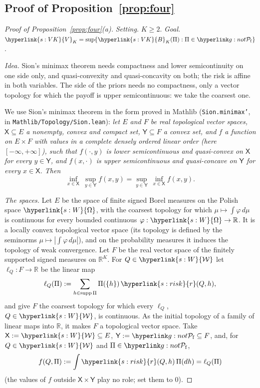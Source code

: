 \documentclass[11pt]{article}
\DeclareRobustCommand{\sy}[2]{{\hyperlink{#1}{#2}}}
\newcommand{\R}{\mathbb{R}}
\newcommand{\1}{\mathbf{1}}
\newcommand{\Wc}{\sy{s:W}{\mathcal W}}
\newcommand{\Om}{\sy{s:W}{\Omega}}
\newcommand{\rk}{\sy{s:risk}{r}}
\newcommand{\VK}{\sy{s:VK}{V}}
\newcommand{\BK}{\sy{s:VK}{B}}
\begin{document}
\subsection{Proof of Proposition~\ref{prop:four}}\label{sec:app-g-proof}

\begin{proof}[Proof of Proposition~\ref{prop:four}(a)]
\textit{Setting.} $K\ge2$. \textit{Goal.} $\VK_K=\sup\{\BK_K(\Pi):\Pi\in\gPf\}$.

\textit{Idea.} Sion's minimax theorem needs compactness and lower semicontinuity on one side only, and quasi-convexity and quasi-concavity on both; the
risk is affine in both variables. The side of the priors needs no compactness, only a vector topology for which the payoff is upper semicontinuous: we
take the coarsest one.

We use Sion's minimax theorem \citep{Sio58} in the form proved in Mathlib (\texttt{Sion.minimax'}, in \texttt{Mathlib/Topology/Sion.lean}): \emph{let $E$ and
$F$ be real topological vector spaces, $\mathsf X\subseteq E$ a nonempty, convex and compact set, $\mathsf Y\subseteq F$ a convex set, and $f$ a function
on $E\times F$ with values in a complete densely ordered linear order (here $[-\infty,+\infty]$), such that $f(\cdot,y)$ is lower semicontinuous and
quasi-convex on $\mathsf X$ for every $y\in\mathsf Y$, and $f(x,\cdot)$ is upper semicontinuous and quasi-concave on $\mathsf Y$ for every
$x\in\mathsf X$. Then}
\[
\inf_{x\in\mathsf X}\ \sup_{y\in\mathsf Y}f(x,y)=\sup_{y\in\mathsf Y}\ \inf_{x\in\mathsf X}f(x,y).
\]

\textit{The spaces.} Let $E$ be the space of finite signed Borel measures on the Polish space $\Om$, with the coarsest topology for which
$\mu\mapsto\int\varphi\,d\mu$ is continuous for every bounded continuous $\varphi:\Om\to\R$. It is a locally convex topological vector space (its topology is
defined by the seminorms $\mu\mapsto|\int\varphi\,d\mu|$), and on the probability measures it induces the topology of weak convergence. Let $F$ be the real
vector space of the finitely supported signed measures on $\R^K$. For $Q\in\Wc$ let $\ell_Q:F\to\R$ be the linear map
\[
\ell_Q(\Pi):=\sum_{h\in\mathrm{supp}\,\Pi}\Pi(\{h\})\,\rk(Q,h),
\]
and give $F$ the coarsest topology for which every $\ell_Q$, $Q\in\Wc$, is continuous. As the initial topology of a family of linear maps into $\R$, it
makes $F$ a topological vector space. Take $\mathsf X:=\Wc\subseteq E$, $\mathsf Y:=\gPf\subseteq F$, and, for $Q\in\Wc$ and $\Pi\in\gPf$,
\[
f(Q,\Pi):=\int\rk(Q,h)\,\Pi(dh)=\ell_Q(\Pi)
\]
(the values of $f$ outside $\mathsf X\times\mathsf Y$ play no role; set them to $0$).


\end{proof}
\end{document}

